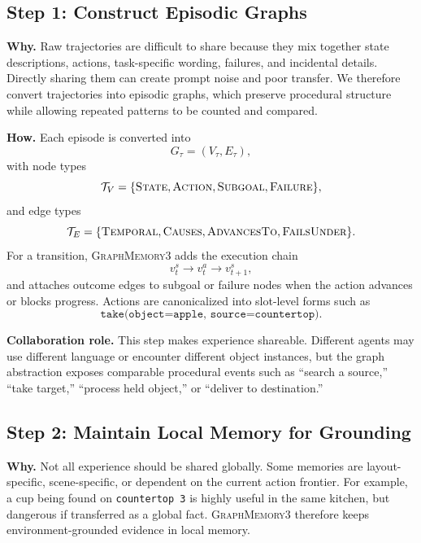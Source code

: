 \documentclass[11pt]{article}
\newcommand{\modelname}{\textsc{GraphMemory3}\xspace}
\begin{document}
\subsection{Step 1: Construct Episodic Graphs}

\textbf{Why.} Raw trajectories are difficult to share because they mix together
state descriptions, actions, task-specific wording, failures, and incidental
details. Directly sharing them can create prompt noise and poor transfer. We
therefore convert trajectories into episodic graphs, which preserve procedural
structure while allowing repeated patterns to be counted and compared.

\textbf{How.} Each episode is converted into
\begin{equation}
    G_{\tau} = (V_{\tau}, E_{\tau}),
\end{equation}
with node types
\begin{equation}
    \mathcal{T}_V =
    \{\textsc{State}, \textsc{Action}, \textsc{Subgoal}, \textsc{Failure}\},
\end{equation}
and edge types
\begin{equation}
    \mathcal{T}_E =
    \{\textsc{Temporal}, \textsc{Causes}, \textsc{AdvancesTo},
    \textsc{FailsUnder}\}.
\end{equation}
For a transition, \modelname adds the execution chain
\begin{equation}
    v_t^{s} \rightarrow v_t^{a} \rightarrow v_{t+1}^{s},
\end{equation}
and attaches outcome edges to subgoal or failure nodes when the action advances
or blocks progress. Actions are canonicalized into slot-level forms such as
\begin{equation}
    \texttt{take(object=apple, source=countertop)}.
\end{equation}

\textbf{Collaboration role.} This step makes experience shareable. Different
agents may use different language or encounter different object instances, but the
graph abstraction exposes comparable procedural events such as ``search a source,''
``take target,'' ``process held object,'' or ``deliver to destination.''

\subsection{Step 2: Maintain Local Memory for Grounding}

\textbf{Why.} Not all experience should be shared globally. Some memories are
layout-specific, scene-specific, or dependent on the current action frontier. For
example, a cup being found on \texttt{countertop 3} is highly useful in the same
kitchen, but dangerous if transferred as a global fact. \modelname therefore keeps
environment-grounded evidence in local memory.
\end{document}
